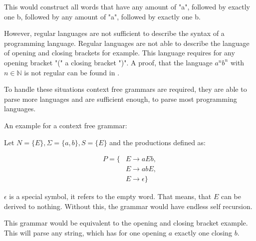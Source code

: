 This would construct all words that have any amount of "a", followed by exactly one b, followed by any amount of "a", followed by exactly one b.

However, regular languages are not sufficient to describe the syntax of a programming language. Regular languages are not able to describe the language of
opening and closing brackets for example.
This language requires for any opening bracket "(" a closing bracket ")".
A proof, that the language $a^nb^n$ with $n\in\mathbb{N}$ is not regular can be found in \cite[page 30]{theoretical_comp_sci}.

To handle these situations context free grammars are required, they are able to parse more languages and are sufficient enough, to parse most programming languages. 

An example for a context free grammar:

Let $N = \{E\}, \Sigma = \{a, b\}, S = \{E\}$ and the productions defined as:

\begin{align*}
P = \{&E \to a E b,\\
&E \to a b E,\\
&E \to \epsilon\}
\end{align*}

$\epsilon$ is a special symbol, it refers to the empty word. That means, that $E$ can be derived to nothing. Without this, the grammar would have endless self recursion.

This grammar would be equivalent to the opening and closing bracket example. This will parse any string, which has for one opening $a$ exactly one closing $b$.

